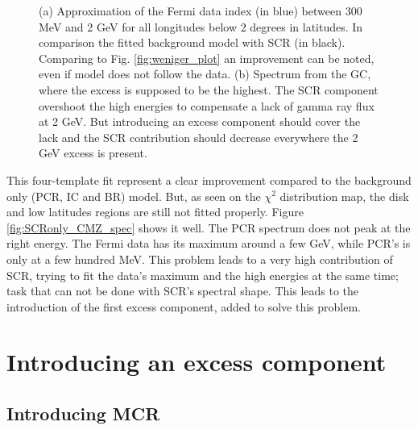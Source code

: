 \begin{figure}[h]
\begin{minipage}[h]{0.45\textwidth}
	  \subcaption{}
	  \label{fig:SCRonly_CMZ_spec}
  \end{minipage}	 
  \caption[SCR fit spectra.]{(a) Approximation of the Fermi data index (in blue) between 300 MeV and 2 GeV for all longitudes below 2 degrees in latitudes. In comparison the fitted background model with SCR (in black). Comparing to Fig. \ref{fig:weniger_plot} an improvement can be noted, even if model does not follow the data. (b) Spectrum from the GC, where the excess is supposed to be the highest. The SCR component overshoot the high energies to compensate a lack of gamma ray flux at 2 GeV. But introducing an excess component should cover the lack and the SCR contribution should decrease everywhere the 2 GeV excess is present.}
	  \label{fig:SCRonly_BKGonly_spec_comp}
\end{figure}


This four-template fit represent a clear improvement compared to the background only (PCR, IC and BR) model. But, as seen on the $\chi^2$ distribution map, the disk and low latitudes regions are still not fitted properly. Figure \ref{fig:SCRonly_CMZ_spec} shows it well. The PCR spectrum does not peak at the right energy. The Fermi data has its maximum around a few GeV, while PCR's is only at a few hundred MeV. This problem leads to a very high contribution of SCR, trying to fit the data's maximum and the high energies at the same time; task that can not be done with SCR's spectral shape.
This leads to the introduction of the first excess component, added to solve this problem.







\newpage
\section{Introducing an excess component}
\subsection{Introducing MCR}

